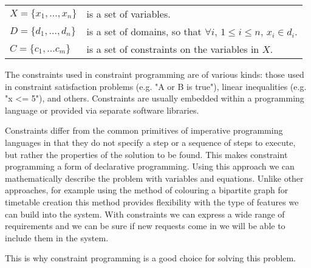 \begin{center}
\begin{tabular}{ll}
$X=\{x_1, ..., x_n\}$ & is a set of variables.\\
$D=\{d_1, ..., d_n\}$ & is a set of domains, so that $\forall{}i$, $1\leq{}i\leq{}n$, $x_i \in{} d_i$.\\
$C=\{c_1, ... c_m\}$  & is a set of constraints on the variables in $X$.\\
\end{tabular}
\end{center}

The constraints used in constraint programming are of various kinds: those used in constraint satisfaction problems (e.g. "A or B is true"), linear inequalities (e.g. "x <= 5"), and others. Constraints are usually embedded within a programming language or provided via separate software libraries.

Constraints differ from the common primitives of imperative programming languages in that they do not specify a step or a sequence of steps to execute, but rather the properties of the solution to be found. This makes constraint programming a form of declarative programming. Using this approach we can mathematically describe the problem with variables and equations. Unlike other approaches, for example using the method of colouring a bipartite graph for timetable creation this method provides flexibility with the type of features we can build into the system. With constraints we can express a wide range of requirements and we can be sure if new requests come in we will be able to include them in the system. \cite{CPWiki}

This is why constraint programming is a good choice for solving this problem.

